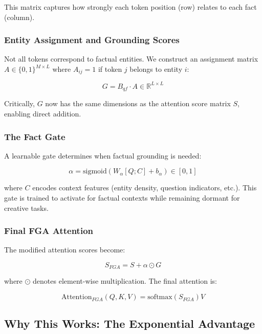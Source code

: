 \documentclass[11pt, a4paper]{article}
\theoremstyle{definition}
\newcommand{\R}{\mathbb{R}}
\newcommand{\softmax}{\text{softmax}}
\newcommand{\sigmoid}{\text{sigmoid}}
\begin{document}
This matrix captures how strongly each token position (row) relates to each fact (column).

\subsubsection{Entity Assignment and Grounding Scores}

Not all tokens correspond to factual entities. We construct an assignment matrix $A \in \{0,1\}^{M \times L}$ where $A_{ij} = 1$ if token $j$ belongs to entity $i$:

\begin{equation}
G = B_{qf} \cdot A \in \R^{L \times L}
\end{equation}

Critically, $G$ now has the same dimensions as the attention score matrix $S$, enabling direct addition.

\subsubsection{The Fact Gate}

A learnable gate determines when factual grounding is needed:

\begin{equation}
\alpha = \sigmoid(W_\alpha [Q; C] + b_\alpha) \in [0,1]
\end{equation}

where $C$ encodes context features (entity density, question indicators, etc.). This gate is trained to activate for factual contexts while remaining dormant for creative tasks.

\subsubsection{Final FGA Attention}

The modified attention scores become:

\begin{equation}
S_{FGA} = S + \alpha \odot G
\end{equation}

where $\odot$ denotes element-wise multiplication. The final attention is:

\begin{equation}
\text{Attention}_{FGA}(Q, K, V) = \softmax(S_{FGA})V
\end{equation}

\subsection{Why This Works: The Exponential Advantage}
\end{document}
